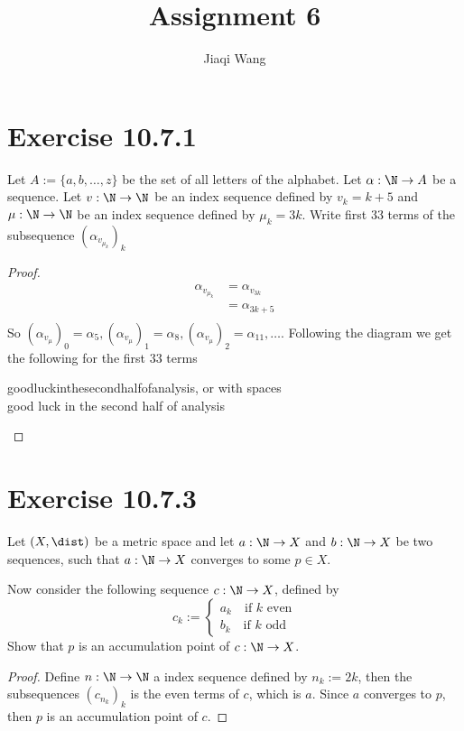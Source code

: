 \documentclass{assignment}
\title{Assignment 6}
\author{Jiaqi Wang }
\begin{document}
    \maketitle

    \section{Exercise 10.7.1}
    \begin{problem}
        Let $A := \{a,b,\dots,z\}$ be the set of all letters of the alphabet. Let $\alpha: \N \to A$ be a sequence.
        Let $v: \N \to \N$ be an index sequence defined by $v_k = k+5$ and $\mu: \N \to \N$ be an index sequence defined by $\mu_k = 3k$.
        Write first 33 terms of the subsequence $(\alpha_{v_{\mu_k}})_k$
    \end{problem}
    \begin{proof}[Proof]
        \begin{align*}
            \alpha_{v_{\mu_k}} &= \alpha_{v_{3k}} \\
            &= \alpha_{3k+5} \\
        \end{align*}
        So $(\alpha_{v_\mu})_0 = \alpha_5, (\alpha_{v_\mu})_1 = \alpha_8, (\alpha_{v_\mu})_2 = \alpha_{11}, \dots$. Following the diagram we get the following for the first 33 terms
        \begin{center}
            goodluckinthesecondhalfofanalysis, or with spaces \\
            good luck in the second half of analysis
        \end{center}
    \end{proof}

    \section{Exercise 10.7.3}
    \begin{problem}
        Let $(X, \dist)$ be a metric space and let $a : \N \to X$ and
        $b : \N \to X$ be two sequences, such that $a : \N \to X$ converges to some $p \in X$.

        Now consider the following sequence $c : \N \to X$, defined by
        $$c_k := \begin{cases} a_k \quad \text{if } k \text{ even}\\ b_k \quad \text{if } k \text{ odd}\end{cases}$$
        Show that $p$ is an accumulation point of $c : \N \to X$.
    \end{problem}
    \begin{proof}[Proof]
        Define $n: \N \to \N$ a index sequence defined by $n_k := 2k$, then the subsequences $(c_{n_k})_k$ is the even terms of $c$, which is $a$. Since $a$ converges to $p$, then $p$ is an accumulation point of $c$.
    \end{proof}
\end{document}
